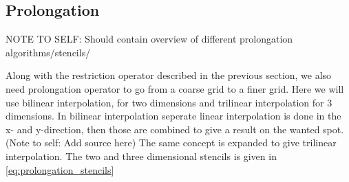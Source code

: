                 \subsection{Prolongation}
                    NOTE TO SELF: Should contain overview of different prolongation algorithms/stencils/

                    \label{sec:prol_simple}

                    Along with the restriction operator described in the previous section, we also need prolongation
                    operator to go from a coarse grid to a finer grid.	Here we will use bilinear interpolation, for
                    two dimensions and trilinear interpolation for 3 dimensions. In bilinear interpolation seperate
                    linear interpolation is done in the x- and y-direction, then those are combined to give a result
                    on the wanted spot. (Note to self: Add source here) The same concept is expanded to give trilinear
                    interpolation. The two and three dimensional stencils is given in \eqref{eq:prolongation_stencils}


